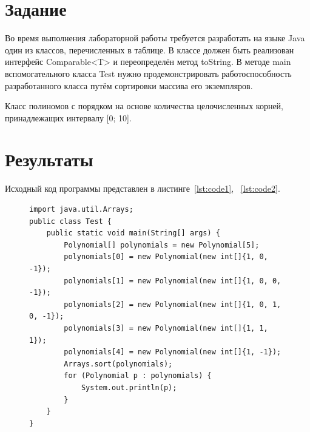 \documentclass[a4paper, 14pt]{extarticle}
\begin{document}
\renewcommand{\ttdefault}{pcr}

\setlength{\tabcolsep}{3pt}
\newpage
\setcounter{page}{2}

\section{Задание}\label{Sect::task}
Во время выполнения лабораторной работы требуется разработать на языке Java один из 
классов, перечисленных в таблице. В классе должен быть реализован интерфейс Comparable<T> и переопределён метод toString. В методе main вспомогательного класса Test нужно продемонстрировать работоспособность разработанного класса путём сортировки массива его экземпляров.

Класс полиномов с порядком на основе количества целочисленных корней, принадлежащих интервалу [0; 10].
\section{Результаты}\label{Sect::res}

Исходный код программы представлен в листинге~\ref{lst:code1}, ~\ref{lst:code2}.

\begin{figure}[!htb]
\begin{lstlisting}[language={},caption={класс Test},label={lst:code1}]
import java.util.Arrays;
public class Test {
    public static void main(String[] args) {
        Polynomial[] polynomials = new Polynomial[5];
        polynomials[0] = new Polynomial(new int[]{1, 0, -1});
        polynomials[1] = new Polynomial(new int[]{1, 0, 0, -1});
        polynomials[2] = new Polynomial(new int[]{1, 0, 1, 0, -1});
        polynomials[3] = new Polynomial(new int[]{1, 1, 1});
        polynomials[4] = new Polynomial(new int[]{1, -1});
        Arrays.sort(polynomials);
        for (Polynomial p : polynomials) {
            System.out.println(p);
        }
    }
}
\end{lstlisting}
\end{figure}
\end{document}
